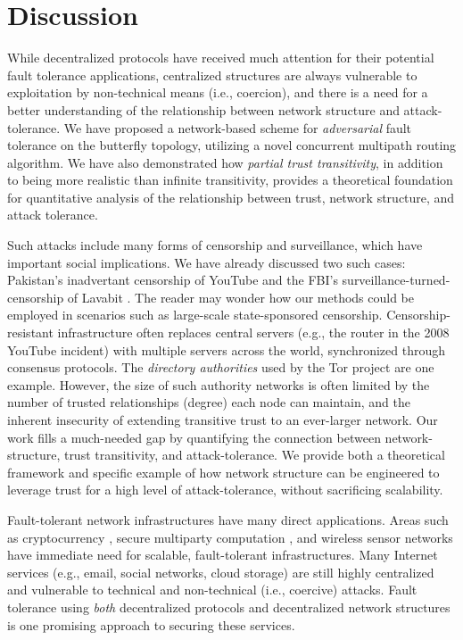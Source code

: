 \documentclass{sig-alternate-05-2015}
\begin{document}
\section{Discussion}
\label{sec-discussion}

While decentralized protocols have received much attention for their potential
fault tolerance applications,
centralized structures are always vulnerable to exploitation by non-technical means (i.e., coercion),
and there is a need for a better understanding of the relationship between network
structure and attack-tolerance.
We have proposed a network-based scheme for {\em adversarial} fault tolerance on the
butterfly topology,
utilizing a novel concurrent multipath routing algorithm.
We have also demonstrated how {\em partial trust transitivity},
in addition to being more realistic than infinite transitivity,
provides a theoretical foundation for
quantitative analysis of the relationship between trust,
network structure, and attack tolerance.

Such attacks include many forms of censorship and surveillance,
which have important social implications.
We have already discussed two such cases:
Pakistan's inadvertant censorship of YouTube
\cite{hunter_pakistan_2008}
and the FBI's surveillance-turned-censorship of Lavabit
\cite{poulsen_edward_2013}.
The reader may wonder how our methods could be employed in scenarios
such as large-scale state-sponsored censorship.
Censorship-resistant infrastructure often replaces central servers
(e.g., the router in the 2008 YouTube incident) with multiple servers across
the world, synchronized through consensus protocols.
The {\em directory authorities} used by the Tor project
\cite{dingledine_tor:_2004} are one example.
However, the size of such authority networks is often limited by the number of
trusted relationships (degree) each node can maintain, and the inherent insecurity of
extending transitive trust to an ever-larger network.
Our work fills a much-needed gap by quantifying the connection between network-structure,
trust transitivity,
and attack-tolerance.
We provide both a theoretical framework and specific example of how network structure
can be engineered to leverage trust for a high level of attack-tolerance,
without sacrificing scalability.

Fault-tolerant network infrastructures have many direct applications.
Areas such as cryptocurrency
\cite{mazieres_stellar_2015,nakamoto_bitcoin:_2008,king_ppcoin:_2012},
secure multiparty computation
\cite{yao_protocols_1982,chaum_multiparty_1988,goldreich_how_1987},
and wireless sensor networks
\cite{khiani_comparative_2013}
have immediate need for scalable, fault-tolerant infrastructures.
Many Internet services (e.g., email, social networks, cloud storage)
are still highly centralized and vulnerable to technical and
non-technical (i.e., coercive) attacks.
Fault tolerance using {\em both}
decentralized protocols and
decentralized network structures
is one promising approach to securing these services.
\end{document}
